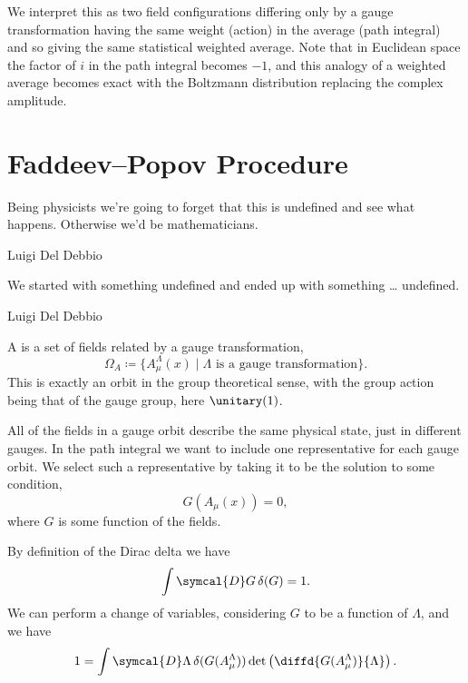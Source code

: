 \documentclass[fleqn]{NotesClass}
\newcommand{\DL}[1]{\symcal{D}#1}
\begin{document}
    We interpret this as two field configurations differing only by a gauge transformation having the same weight (action) in the average (path integral) and so giving the same statistical weighted average.
    Note that in Euclidean space the factor of \(i\) in the path integral becomes \(-1\), and this analogy of a weighted average becomes exact with the Boltzmann distribution replacing the complex amplitude.
    
    \section{Faddeev--Popov Procedure}
    \epigraph{Being physicists we're going to forget that this is undefined and see what happens. Otherwise we'd be mathematicians.}{Luigi Del Debbio}
    \epigraph{We started with something undefined and ended up with something \dots{} undefined.}{Luigi Del Debbio}
    A  is a set of fields related by a gauge transformation,
    \begin{equation}
        \Omega_A \coloneqq \{ A_\mu^\Lambda(x) \mid \Lambda \text{ is a gauge transformation} \}.
    \end{equation}
    This is exactly an orbit in the group theoretical sense, with the group action being that of the gauge group, here \(\unitary(1)\).
    
    All of the fields in a gauge orbit describe the same physical state, just in different gauges.
    In the path integral we want to include one representative for each gauge orbit.
    We select such a representative by taking it to be the solution to some  condition,
    \begin{equation}
        G(A_\mu(x)) = 0,
    \end{equation}
    where \(G\) is some function of the fields.
    
    By definition of the Dirac delta we have
    \begin{equation}
        \int \DL{G} \, \delta(G) = 1.
    \end{equation}
    We can perform a change of variables, considering \(G\) to be a function of \(\Lambda\), and we have
    \begin{equation}
        1 = \int \DL{\Lambda} \, \delta(G(A_\mu^\Lambda)) \det\left( \diffd{G(A_\mu^\Lambda)}{\Lambda} \right).
    \end{equation}
    
\end{document}
